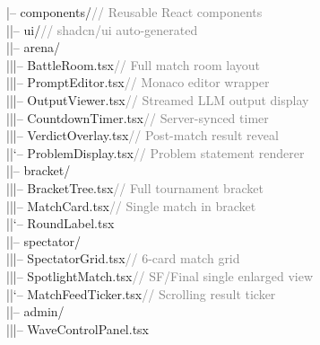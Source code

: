 \documentclass[11pt, a4paper]{article}
\begin{document}
\begin{tcolorbox}[codebox]
\small\color{white}\ttfamily
\textcolor{codeblue}{|--} components/\textcolor{gray}{\quad\quad\quad\quad\quad\quad\quad\quad\quad\quad// Reusable React components}\\
\textcolor{codeblue}{|\quad |--} ui/\textcolor{gray}{\quad\quad\quad\quad\quad\quad\quad\quad\quad\quad\quad// shadcn/ui auto-generated}\\
\textcolor{codeblue}{|\quad |--} arena/\\
\textcolor{codeblue}{|\quad |\quad |--} BattleRoom.tsx\textcolor{gray}{\quad\quad\quad// Full match room layout}\\
\textcolor{codeblue}{|\quad |\quad |--} PromptEditor.tsx\textcolor{gray}{\quad\quad// Monaco editor wrapper}\\
\textcolor{codeblue}{|\quad |\quad |--} OutputViewer.tsx\textcolor{gray}{\quad\quad// Streamed LLM output display}\\
\textcolor{codeblue}{|\quad |\quad |--} CountdownTimer.tsx\textcolor{gray}{\quad// Server-synced timer}\\
\textcolor{codeblue}{|\quad |\quad |--} VerdictOverlay.tsx\textcolor{gray}{\quad// Post-match result reveal}\\
\textcolor{codeblue}{|\quad |\quad `--} ProblemDisplay.tsx\textcolor{gray}{\quad// Problem statement renderer}\\
\textcolor{codeblue}{|\quad |--} bracket/\\
\textcolor{codeblue}{|\quad |\quad |--} BracketTree.tsx\textcolor{gray}{\quad\quad\quad// Full tournament bracket}\\
\textcolor{codeblue}{|\quad |\quad |--} MatchCard.tsx\textcolor{gray}{\quad\quad\quad\quad// Single match in bracket}\\
\textcolor{codeblue}{|\quad |\quad `--} RoundLabel.tsx\\
\textcolor{codeblue}{|\quad |--} spectator/\\
\textcolor{codeblue}{|\quad |\quad |--} SpectatorGrid.tsx\textcolor{gray}{\quad\quad// 6-card match grid}\\
\textcolor{codeblue}{|\quad |\quad |--} SpotlightMatch.tsx\textcolor{gray}{\quad// SF/Final single enlarged view}\\
\textcolor{codeblue}{|\quad |\quad `--} MatchFeedTicker.tsx\textcolor{gray}{\quad// Scrolling result ticker}\\
\textcolor{codeblue}{|\quad |--} admin/\\
\textcolor{codeblue}{|\quad |\quad |--} WaveControlPanel.tsx\\

\end{tcolorbox}
\end{document}

